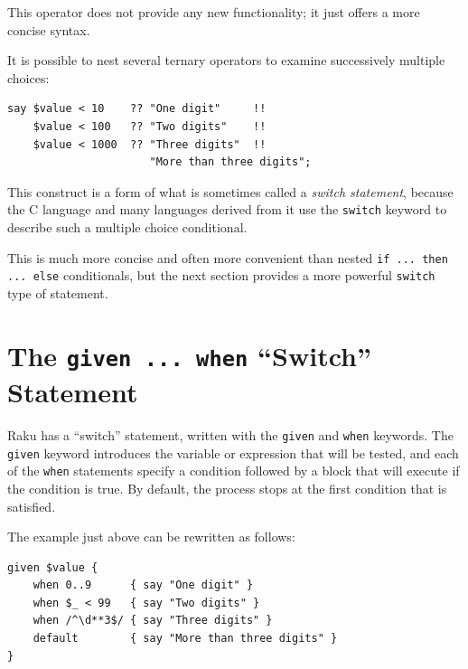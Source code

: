 This operator does not provide any new functionality; it just 
offers a more concise syntax.

It is possible to nest several ternary operators to examine 
successively multiple choices:

\begin{verbatim}
say $value < 10    ?? "One digit"     !! 
    $value < 100   ?? "Two digits"    !!
    $value < 1000  ?? "Three digits"  !!
                      "More than three digits";
\end{verbatim}

This construct is a form of what is sometimes called a 
\emph{switch statement}, because the C language and 
many languages derived from it use the {\tt switch} keyword 
to describe such a multiple choice conditional.

This is much more concise and often more convenient than nested 
{\tt if ... then ... else} conditionals, but the next section 
provides a more powerful {\tt switch} type of statement.

\section{The {\tt given ... when} ``Switch'' Statement}
\label{given_when}

Raku has a ``switch'' statement, written with the 
{\tt given} and {\tt when} keywords. The 
{\tt given} keyword introduces the variable or expression 
that will be tested, and each of the {\tt when} 
statements specify a condition followed by a block that 
will execute if the condition is true. By default, the 
process stops at the first condition that is satisfied.

The example just above can be rewritten as follows:

\begin{verbatim}
given $value {
    when 0..9      { say "One digit" }
    when $_ < 99   { say "Two digits" }
    when /^\d**3$/ { say "Three digits" }
    default        { say "More than three digits" }
}
\end{verbatim}

